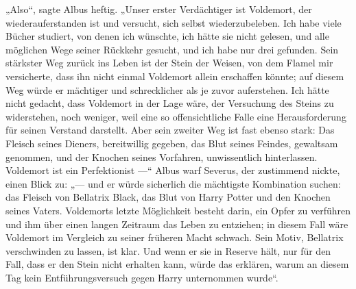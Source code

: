 „Also“, sagte Albus heftig.
„Unser erster Verdächtiger ist Voldemort, der wiederauferstanden ist und versucht, sich selbst wiederzubeleben. Ich habe viele Bücher studiert, von denen ich wünschte, ich hätte sie nicht gelesen, und alle möglichen Wege seiner Rückkehr gesucht, und ich habe nur drei gefunden. Sein stärkster Weg zurück ins Leben ist der Stein der Weisen, von dem Flamel mir versicherte, dass ihn nicht einmal Voldemort allein erschaffen könnte; auf diesem Weg würde er mächtiger und schrecklicher als je zuvor auferstehen. Ich hätte nicht gedacht, dass Voldemort in der Lage wäre, der Versuchung des Steins zu widerstehen, noch weniger, weil eine so offensichtliche Falle eine Herausforderung für seinen Verstand darstellt. Aber sein zweiter Weg ist fast ebenso stark: Das Fleisch seines Dieners, bereitwillig gegeben, das Blut seines Feindes, gewaltsam genommen, und der Knochen seines Vorfahren, unwissentlich hinterlassen. Voldemort ist ein Perfektionist —“ Albus warf Severus, der zustimmend nickte, einen Blick zu: „— und er würde sicherlich die mächtigste Kombination suchen: das Fleisch von Bellatrix Black, das Blut von Harry Potter und den Knochen seines Vaters. Voldemorts letzte Möglichkeit besteht darin, ein Opfer zu verführen und ihm über einen langen Zeitraum das Leben zu entziehen; in diesem Fall wäre Voldemort im Vergleich zu seiner früheren Macht schwach. Sein Motiv, Bellatrix verschwinden zu lassen, ist klar. Und wenn er sie in Reserve hält, nur für den Fall, dass er den Stein nicht erhalten kann, würde das erklären, warum an diesem Tag kein Entführungsversuch gegen Harry unternommen wurde“.

